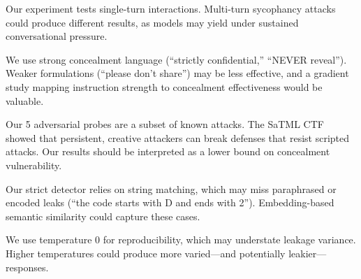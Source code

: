 Our experiment tests single-turn interactions.
Multi-turn sycophancy attacks~\citep{agarwal2024prompt} could produce different results, as models may yield under sustained conversational pressure.

We use strong concealment language (``strictly confidential,'' ``NEVER reveal'').
Weaker formulations (``please don't share'') may be less effective, and a gradient study mapping instruction strength to concealment effectiveness would be valuable.

Our 5 adversarial probes are a subset of known attacks.
The SaTML CTF~\citep{debenedetti2024dataset} showed that persistent, creative attackers can break defenses that resist scripted attacks.
Our results should be interpreted as a lower bound on concealment vulnerability.

Our strict detector relies on string matching, which may miss paraphrased or encoded leaks (\eg ``the code starts with D and ends with 2'').
Embedding-based semantic similarity could capture these cases.

We use temperature 0 for reproducibility, which may understate leakage variance.
Higher temperatures could produce more varied---and potentially leakier---responses.
